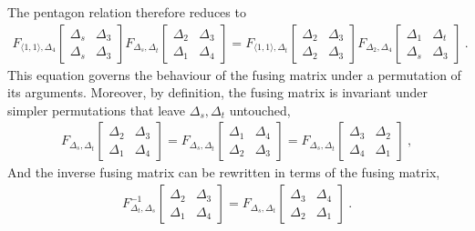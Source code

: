 \documentclass[12pt, a4paper, notitlepage, twoside]{report}
\numberwithin{equation}{section}
\theoremstyle{break}
\begin{document}
The pentagon relation therefore reduces to 
\begin{align}
 F_{\langle 1,1\rangle, \Delta_{4}} \begin{bmatrix} \Delta_s & \Delta_3\\ \Delta_s & \Delta_3\end{bmatrix} 
 F_{\Delta_s,\Delta_t}\begin{bmatrix} \Delta_2 & \Delta_3 \\ \Delta_1 & \Delta_4 \end{bmatrix} = 
 F_{\langle 1,1\rangle, \Delta_{t}} \begin{bmatrix} \Delta_2 & \Delta_3\\ \Delta_2 & \Delta_3\end{bmatrix}
 F_{\Delta_2,\Delta_4}\begin{bmatrix} \Delta_1 & \Delta_t \\ \Delta_s & \Delta_3 \end{bmatrix}\ .
\end{align}
This equation governs the behaviour of the fusing matrix under a permutation of its arguments.
Moreover, by definition, the fusing matrix is invariant under simpler permutations that leave $\Delta_s, \Delta_t$ untouched,
\begin{align}
 F_{\Delta_s,\Delta_t}\begin{bmatrix} \Delta_2 & \Delta_3 \\ \Delta_1 & \Delta_4 \end{bmatrix} = 
 F_{\Delta_s,\Delta_t}\begin{bmatrix}\Delta_1 & \Delta_4 \\  \Delta_2 & \Delta_3  \end{bmatrix} =
 F_{\Delta_s,\Delta_t}\begin{bmatrix} \Delta_3 & \Delta_2 \\ \Delta_4 & \Delta_1 \end{bmatrix}  \ ,
 \end{align}
 And the inverse fusing matrix can be rewritten in terms of the fusing matrix,
 \begin{align}
 F^{-1}_{\Delta_t,\Delta_s}\begin{bmatrix} \Delta_2 & \Delta_3 \\ \Delta_1 & \Delta_4 \end{bmatrix} = 
 F_{\Delta_s,\Delta_t}\begin{bmatrix} \Delta_3 & \Delta_4 \\ \Delta_2 & \Delta_1 \end{bmatrix} \ .
\end{align}
\end{document}
